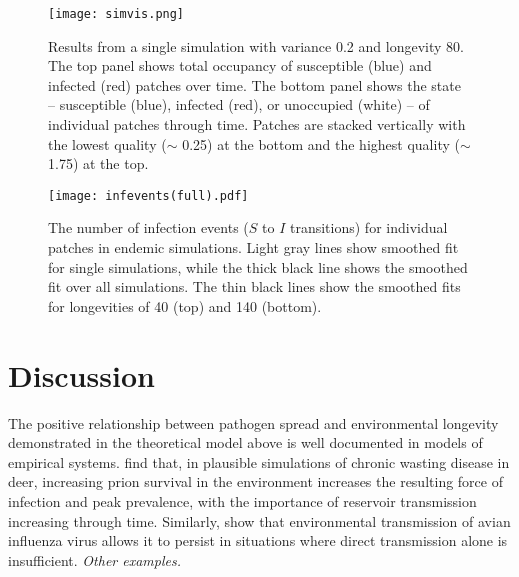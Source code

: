 \documentclass{svjour3}
\begin{document}
\begin{figure}
\centering
\texttt{[image: simvis.png]}
\caption{Results from a single simulation with variance 0.2 and longevity 80.  The top panel shows total occupancy of susceptible (blue) and infected (red) patches over time.  The bottom panel shows the state -- susceptible (blue), infected (red), or unoccupied (white) -- of individual patches through time.  Patches are stacked vertically with the lowest quality ($\sim$ 0.25) at the bottom and the highest quality ($\sim$ 1.75) at the top.}
\label{simvis}
\end{figure}


\begin{figure}
\centering
\texttt{[image: infevents(full).pdf]}
\caption{The number of infection events ($S$ to $I$ transitions) for individual patches in endemic simulations.  Light gray lines show smoothed fit for single simulations, while the thick black line shows the smoothed fit over all simulations.  The thin black lines show the smoothed fits for longevities of 40 (top) and 140 (bottom).}
\label{infections}
\end{figure}


\section{Discussion}
\label{discussion} 

The positive relationship between pathogen spread and environmental longevity demonstrated in the theoretical model above is well documented in models of empirical systems.  \cite{Almberg2011} find that, in plausible simulations of chronic wasting disease in deer, increasing prion survival in the environment increases the resulting force of infection and peak prevalence, with the  importance of reservoir transmission increasing through time.  Similarly, \cite{Breban2009} show that environmental transmission of avian influenza virus allows it to persist in situations where direct transmission alone is insufficient.  \emph{Other examples.}
\end{document}
